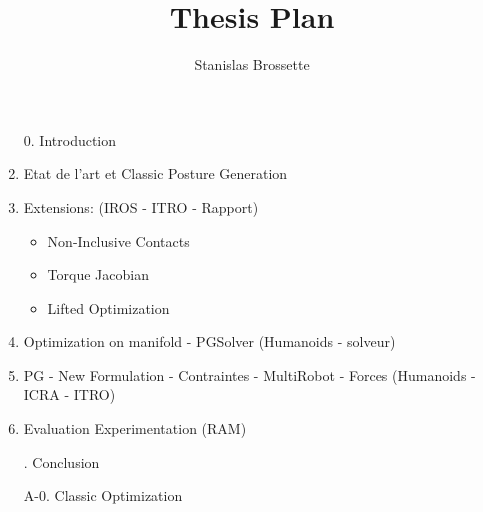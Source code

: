 \documentclass{article}
\begin{document}
\title{Thesis Plan}
\author{Stanislas Brossette}
\maketitle
\begin{enumerate}
  \item[0.] Introduction
  \item Etat de l'art et Classic Posture Generation
  \item Extensions: (IROS - ITRO - Rapport)
  \begin{itemize}
    \item Non-Inclusive Contacts
    \item Torque Jacobian
    \item Lifted Optimization
  \end{itemize}
  \item Optimization on manifold - PGSolver (Humanoids - solveur)
  \item PG - New Formulation - Contraintes - MultiRobot - Forces (Humanoids - ICRA - ITRO)
  \item Evaluation Experimentation (RAM)
  \item[.] Conclusion
  \item[A-0.] Classic Optimization
\end{enumerate}
\end{document}
